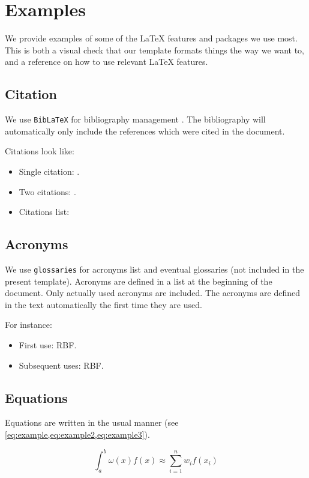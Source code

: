 \section{Examples}
We provide examples of some of the LaTeX features and packages we use most.
This is both a visual check that our template formats things the way we
want to, and a reference on how to use relevant LaTeX features.

\subsection{Citation}
We use \lstinline{BibLaTeX} \cite{biblatex} for bibliography management . The
bibliography will automatically only include the references which were cited in
the document.

Citations look like:
\begin{itemize}
\item Single citation: \cite{Gehrels:2016}.
\item Two citations: \cite{inkscape,gnuplot}.
\item Citations list: \cite{inkscape,gnuplot,thomashoullier/alarm-clock}
\end{itemize}

\subsection{Acronyms}
We use \lstinline{glossaries} \cite{glossaries} for acronyms list and eventual
glossaries (not included in the present template).  Acronyms are defined in a
list at the beginning of the document. Only actually used acronyms are
included. The acronyms are defined in the text automatically the first time
they are used.

For instance:
\begin{itemize}
\item First use: \gls{RBF}.
\item Subsequent uses: \gls{RBF}.
\end{itemize}

\subsection{Equations}
Equations are written in the usual manner (see
\cref{eq:example,eq:example2,eq:example3}).

\begin{equation} \label{eq:example}
\int_{a}^{b} \omega(x) f(x) \approx \sum_{i=1}^n w_i f(x_i)
\end{equation}

